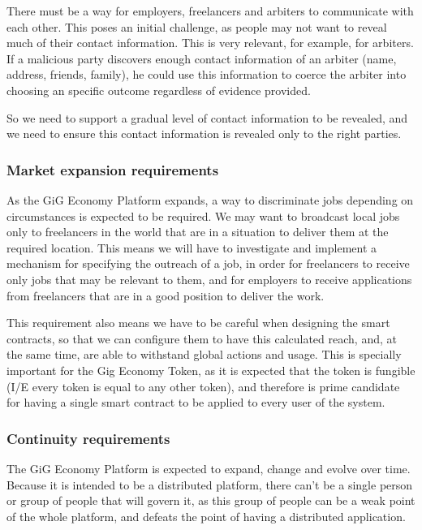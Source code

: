 \documentclass{article}
\begin{document}
There must be a way for employers, freelancers and arbiters to communicate with each other. This poses an initial challenge, as people may not want to reveal much of their contact information. This is very relevant, for example, for arbiters. If a malicious party discovers enough contact information of an arbiter (name, address, friends, family), he could use this information to coerce the arbiter into choosing an specific outcome regardless of evidence provided.

So we need to support a gradual level of contact information to be revealed, and we need to ensure this contact information is revealed only to the right parties.

\subsubsection{Market expansion requirements}

As the GiG Economy Platform expands, a way to discriminate jobs depending on circumstances is expected to be required. We may want to broadcast local jobs only to freelancers in the world that are in a situation to deliver them at the required location. This means we will have to investigate and implement a mechanism for specifying the outreach of a job, in order for freelancers to receive only jobs that may be relevant to them, and for employers to receive applications from freelancers that are in a good position to deliver the work.

This requirement also means we have to be careful when designing the smart contracts, so that we can configure them to have this calculated reach, and, at the same time, are able to withstand global actions and usage. This is specially important for the Gig Economy Token, as it is expected that the token is fungible (I/E every token is equal to any other token), and therefore is prime candidate for having a single smart contract to be applied to every user of the system.

\subsubsection{Continuity requirements}

The GiG Economy Platform is expected to expand, change and evolve over time. Because it is intended to be a distributed platform, there can't be a single person or group of people that will govern it, as this group of people can be a weak point of the whole platform, and defeats the point of having a distributed application.
\end{document}
